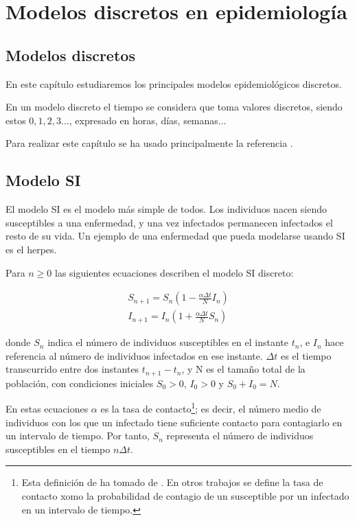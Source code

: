 \chapter{Modelos discretos en epidemiología}

\section{Modelos discretos}

En este capítulo estudiaremos los principales modelos epidemiológicos discretos.

En un modelo discreto el tiempo se considera que toma valores discretos, siendo estos $0,1,2,3...$, expresado en horas, días, semanas...

Para realizar este capítulo se ha usado principalmente la referencia \cite{allenDiscretetimeSISIR1994}.

\section{Modelo SI}
El modelo SI es el modelo más simple de todos. Los individuos nacen siendo susceptibles a una enfermedad, y una vez infectados permanecen infectados el resto de su vida.
Un ejemplo de una enfermedad que pueda modelarse usando SI es el herpes.

Para $n\geq 0$ las siguientes ecuaciones describen el modelo SI discreto:

\begin{equation}
\label{eqn: SI}
\begin{aligned}
S_{n+1}=S_n\left( 1-\frac{\alpha\Delta t}{N}I_n\right) \\
I_{n+1}=I_n\left( 1+\frac{\alpha\Delta t}{N}S_n\right)
\end{aligned}
\end{equation}

donde $S_n$ indica el número de individuos susceptibles en el instante $t_n$, e $I_n$ hace referencia al número de individuos infectados en ese instante. $\Delta t$ es el tiempo transcurrido entre dos instantes $t_{n+1}-t_n$, y N es el tamaño total de la población, con condiciones iniciales $S_0>0$, $I_0>0$ y $S_0+I_0=N$.

En estas ecuaciones $\alpha$ es la tasa de contacto\footnote{Esta definición de ha tomado de \cite{allenDiscretetimeSISIR1994}. En otros trabajos se define la tasa de contacto xomo la probabilidad de contagio de un susceptible por un infectado en un intervalo de tiempo.}; es decir, el número medio de individuos con los que un infectado tiene suficiente contacto para contagiarlo en un intervalo de tiempo. Por tanto, $S_n$ representa el número de individuos susceptibles en el tiempo $n\Delta t$.


